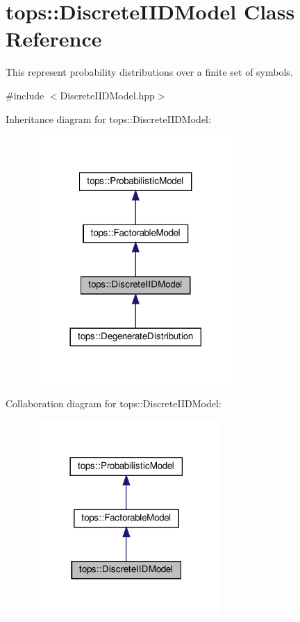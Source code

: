 \hypertarget{classtops_1_1DiscreteIIDModel}{}\section{tops\+:\+:Discrete\+I\+I\+D\+Model Class Reference}
\label{classtops_1_1DiscreteIIDModel}


This represent probability distributions over a finite set of symbols.  




{\ttfamily \#include $<$Discrete\+I\+I\+D\+Model.\+hpp$>$}



Inheritance diagram for tops\+:\+:Discrete\+I\+I\+D\+Model\+:
\nopagebreak
\begin{figure}[H]
\begin{center}
\leavevmode
\includegraphics[width=221pt]{classtops_1_1DiscreteIIDModel__inherit__graph}
\end{center}
\end{figure}


Collaboration diagram for tops\+:\+:Discrete\+I\+I\+D\+Model\+:
\nopagebreak
\begin{figure}[H]
\begin{center}
\leavevmode
\includegraphics[width=201pt]{classtops_1_1DiscreteIIDModel__coll__graph}
\end{center}
\end{figure}
